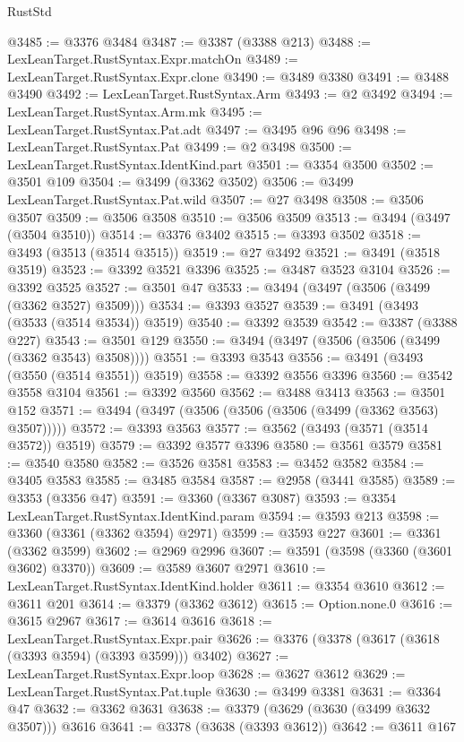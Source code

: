 \begin{lexlean}{RustStd}
\begin{coremodule}
@3485 := @3376 @3484
@3487 := @3387 (@3388 @213)
@3488 := LexLeanTarget.RustSyntax.Expr.matchOn
@3489 := LexLeanTarget.RustSyntax.Expr.clone
@3490 := @3489 @3380
@3491 := @3488 @3490
@3492 := LexLeanTarget.RustSyntax.Arm
@3493 := @2 @3492
@3494 := LexLeanTarget.RustSyntax.Arm.mk
@3495 := LexLeanTarget.RustSyntax.Pat.adt
@3497 := @3495 @96 @96
@3498 := LexLeanTarget.RustSyntax.Pat
@3499 := @2 @3498
@3500 := LexLeanTarget.RustSyntax.IdentKind.part
@3501 := @3354 @3500
@3502 := @3501 @109
@3504 := @3499 (@3362 @3502)
@3506 := @3499 LexLeanTarget.RustSyntax.Pat.wild
@3507 := @27 @3498
@3508 := @3506 @3507
@3509 := @3506 @3508
@3510 := @3506 @3509
@3513 := @3494 (@3497 (@3504 @3510))
@3514 := @3376 @3402
@3515 := @3393 @3502
@3518 := @3493 (@3513 (@3514 @3515))
@3519 := @27 @3492
@3521 := @3491 (@3518 @3519)
@3523 := @3392 @3521 @3396
@3525 := @3487 @3523 @3104
@3526 := @3392 @3525
@3527 := @3501 @47
@3533 := @3494 (@3497 (@3506 (@3499 (@3362 @3527) @3509)))
@3534 := @3393 @3527
@3539 := @3491 (@3493 (@3533 (@3514 @3534)) @3519)
@3540 := @3392 @3539
@3542 := @3387 (@3388 @227)
@3543 := @3501 @129
@3550 := @3494 (@3497 (@3506 (@3506 (@3499 (@3362 @3543) @3508))))
@3551 := @3393 @3543
@3556 := @3491 (@3493 (@3550 (@3514 @3551)) @3519)
@3558 := @3392 @3556 @3396
@3560 := @3542 @3558 @3104
@3561 := @3392 @3560
@3562 := @3488 @3413
@3563 := @3501 @152
@3571 := @3494 (@3497 (@3506 (@3506 (@3506 (@3499 (@3362 @3563) @3507)))))
@3572 := @3393 @3563
@3577 := @3562 (@3493 (@3571 (@3514 @3572)) @3519)
@3579 := @3392 @3577 @3396
@3580 := @3561 @3579
@3581 := @3540 @3580
@3582 := @3526 @3581
@3583 := @3452 @3582
@3584 := @3405 @3583
@3585 := @3485 @3584
@3587 := @2958 (@3441 @3585)
@3589 := @3353 (@3356 @47)
@3591 := @3360 (@3367 @3087)
@3593 := @3354 LexLeanTarget.RustSyntax.IdentKind.param
@3594 := @3593 @213
@3598 := @3360 (@3361 (@3362 @3594) @2971)
@3599 := @3593 @227
@3601 := @3361 (@3362 @3599)
@3602 := @2969 @2996
@3607 := @3591 (@3598 (@3360 (@3601 @3602) @3370))
@3609 := @3589 @3607 @2971
@3610 := LexLeanTarget.RustSyntax.IdentKind.holder
@3611 := @3354 @3610
@3612 := @3611 @201
@3614 := @3379 (@3362 @3612)
@3615 := Option.none.{0}
@3616 := @3615 @2967
@3617 := @3614 @3616
@3618 := LexLeanTarget.RustSyntax.Expr.pair
@3626 := @3376 (@3378 (@3617 (@3618 (@3393 @3594) (@3393 @3599))) @3402)
@3627 := LexLeanTarget.RustSyntax.Expr.loop
@3628 := @3627 @3612
@3629 := LexLeanTarget.RustSyntax.Pat.tuple
@3630 := @3499 @3381
@3631 := @3364 @47
@3632 := @3362 @3631
@3638 := @3379 (@3629 (@3630 (@3499 @3632 @3507))) @3616
@3641 := @3378 (@3638 (@3393 @3612))
@3642 := @3611 @167

\end{coremodule}
\end{lexlean}
